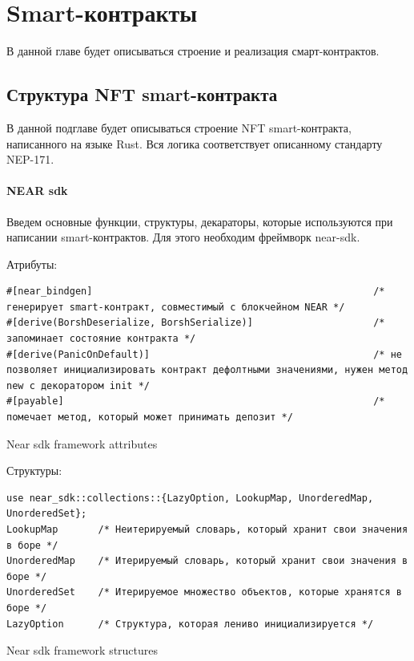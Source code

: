 \section{Smart-контракты}
\label{section.main.smart}

В данной главе будет описываться строение и реализация смарт-контрактов.

\subsection{Структура NFT smart-контракта}
\label{section.main.smart.struct}
В данной подглаве будет описываться строение NFT smart-контракта, написанного на языке Rust. Вся логика соответствует описанному стандарту NEP-171\cite{nftstandart}.
\paragraph{NEAR sdk}
Введем основные функции, структуры, декараторы, которые используются при написании smart-контрактов. Для этого необходим фреймворк near-sdk\cite{nearsdkrs}.

Атрибуты:

\begin{listing}[H]
\begin{verbatim}
#[near_bindgen]                                                 /* генерирует smart-контракт, совместимый с блокчейном NEAR */
#[derive(BorshDeserialize, BorshSerialize)]                     /* запоминает состояние контракта */
#[derive(PanicOnDefault)]                                       /* не позволяет инициализировать контракт дефолтными значениями, нужен метод new с декоратором init */
#[payable]                                                      /* помечает метод, который может принимать депозит */
\end{verbatim}
\caption{Near sdk framework attributes}
\label{near.attributes}
\end{listing}

Структуры:

\begin{listing}[H]
\begin{verbatim}
use near_sdk::collections::{LazyOption, LookupMap, UnorderedMap, UnorderedSet};
LookupMap       /* Неитерируемый словарь, который хранит свои значения в боре */
UnorderedMap    /* Итерируемый словарь, который хранит свои значения в боре */
UnorderedSet    /* Итерируемое множество объектов, которые хранятся в боре */
LazyOption      /* Структура, которая лениво инициализируется */
\end{verbatim}
\caption{Near sdk framework structures}
\label{near.structures}
\end{listing}

